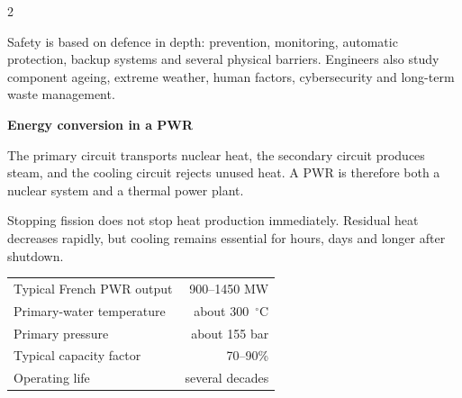 \begin{multicols}{2}
\begin{ecarticle}
Safety is based on defence in depth: prevention, monitoring, automatic protection, backup systems and several physical barriers. Engineers also study component ageing, extreme weather, human factors, cybersecurity and long-term waste management.
\end{ecarticle}

\columnbreak

\begin{engineeringfocus}
\textbf{Energy conversion in a PWR}
\begin{center}
\end{center}
The primary circuit transports nuclear heat, the secondary circuit produces steam, and the cooling circuit rejects unused heat. A PWR is therefore both a nuclear system and a thermal power plant.
\end{engineeringfocus}

\begin{tcolorbox}[title=\sffamily\bfseries Did You Know?,colback=yellow!10,colframe=ECOrange]
Stopping fission does not stop heat production immediately. Residual heat decreases rapidly, but cooling remains essential for hours, days and longer after shutdown.
\end{tcolorbox}

\begin{tcolorbox}[title=\sffamily\bfseries Key Figures,colback=ECLightBlue,colframe=ECBlue]
\begin{tabularx}{\linewidth}{@{}Xr@{}}
Typical French PWR output & 900--1450 MW\\
Primary-water temperature & about 300~$^{\circ}$C\\
Primary pressure & about 155 bar\\
Typical capacity factor & 70--90\%\\
Operating life & several decades
\end{tabularx}
\end{tcolorbox}


\end{multicols}
